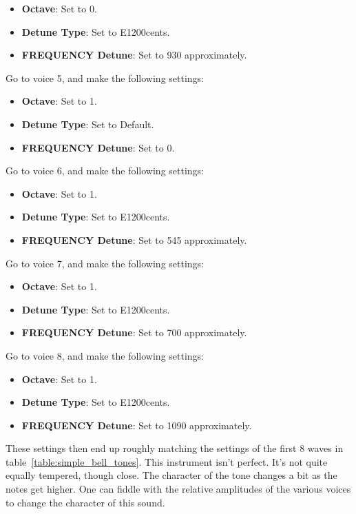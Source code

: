 \begin{enumber}
\begin{itemize}
            \item \textbf{Octave}: Set to 0.
            \item \textbf{Detune Type}: Set to E1200cents.
            \item \textbf{FREQUENCY Detune}: Set to 930 approximately.
         \end{itemize}
      \item Go to voice 5, and make the following settings:
         \begin{itemize}
            \item \textbf{Octave}: Set to 1.
            \item \textbf{Detune Type}: Set to Default.
            \item \textbf{FREQUENCY Detune}: Set to 0.
         \end{itemize}
      \item Go to voice 6, and make the following settings:
         \begin{itemize}
            \item \textbf{Octave}: Set to 1.
            \item \textbf{Detune Type}: Set to E1200cents.
            \item \textbf{FREQUENCY Detune}: Set to 545 approximately.
         \end{itemize}
      \item Go to voice 7, and make the following settings:
         \begin{itemize}
            \item \textbf{Octave}: Set to 1.
            \item \textbf{Detune Type}: Set to E1200cents.
            \item \textbf{FREQUENCY Detune}: Set to 700 approximately.
         \end{itemize}
      \item Go to voice 8, and make the following settings:
         \begin{itemize}
            \item \textbf{Octave}: Set to 1.
            \item \textbf{Detune Type}: Set to E1200cents.
            \item \textbf{FREQUENCY Detune}: Set to 1090 approximately.
         \end{itemize}
   \end{enumber}

   These settings then end up roughly matching the settings of the first 8
   waves in table~\ref{table:simple_bell_tones}.
   This instrument isn't perfect.  It's not quite equally tempered, though
   close.  The character of the tone changes a bit as the notes get higher.
   One can fiddle with the relative amplitudes of the various voices to
   change the character of this sound.

